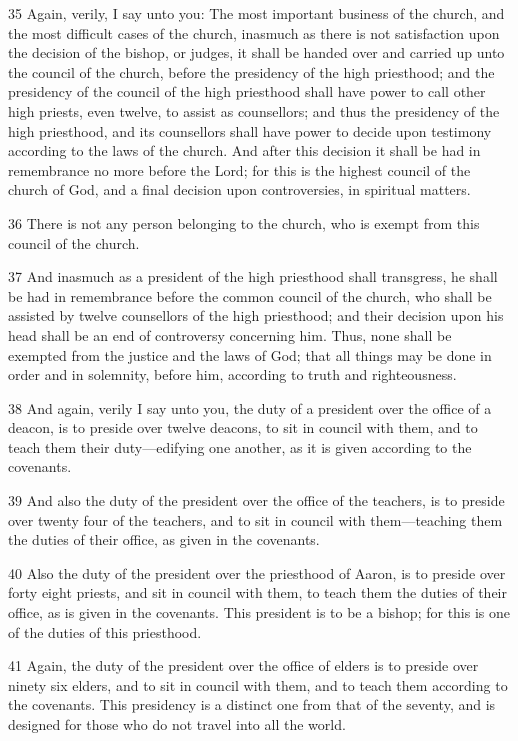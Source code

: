 				35 Again, verily, I say unto you: The most important business of the church, and the most difficult cases of the church, inasmuch as there is not satisfaction upon the decision of the bishop, or judges, it shall be handed over and carried up unto the council of the church, before the presidency of the high priesthood; and the presidency of the council of the high priesthood shall have power to call other high priests, even twelve, to assist as counsellors; and thus the presidency of the high priesthood, and its counsellors shall have power to decide upon testimony according to the laws of the church. And after this decision it shall be had in remembrance no more before the Lord; for this is the highest council of the church of God, and a final decision upon controversies, in spiritual matters.

				36 There is not any person belonging to the church, who is exempt from this council of the church.

				37 And inasmuch as a president of the high priesthood shall transgress, he shall be had in remembrance before the common council of the church, who shall be assisted by twelve counsellors of the high priesthood; and their decision upon his head shall be an end of controversy concerning him. Thus, none shall be exempted from the justice and the laws of God; that all things may be done in order and in solemnity, before him, according to truth and righteousness.

				38 And again, verily I say unto you, the duty of a president over the office of a deacon, is to preside over twelve deacons, to sit in council with them, and to teach them their duty---edifying one another, as it is given according to the covenants.

				39 And also the duty of the president over the office of the teachers, is to preside over twenty four of the teachers, and to sit in council with them---teaching them the duties of their office, as given in the covenants.

				40 Also the duty of the president over the priesthood of Aaron, is to preside over forty eight priests, and sit in council with them, to teach them the duties of their office, as is given in the covenants. This president is to be a bishop; for this is one of the duties of this priesthood.

				41 Again, the duty of the president over the office of elders is to preside over ninety six elders, and to sit in council with them, and to teach them according to the covenants. This presidency is a distinct one from that of the seventy, and is designed for those who do not travel into all the world.

